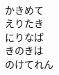 \documentclass[10pt,b5j]{tarticle} %
\begin{document}
\begin{enumerate}
\begin{minipage}[c]{\blocksize}
        \vspace{\linespace}
        \item~\\
        かきめて\\
        えりたき\\
        にりなば\\
        きのきは\\
        のけてれん
    
    \end{minipage}
\end{enumerate} %
\end{document}

